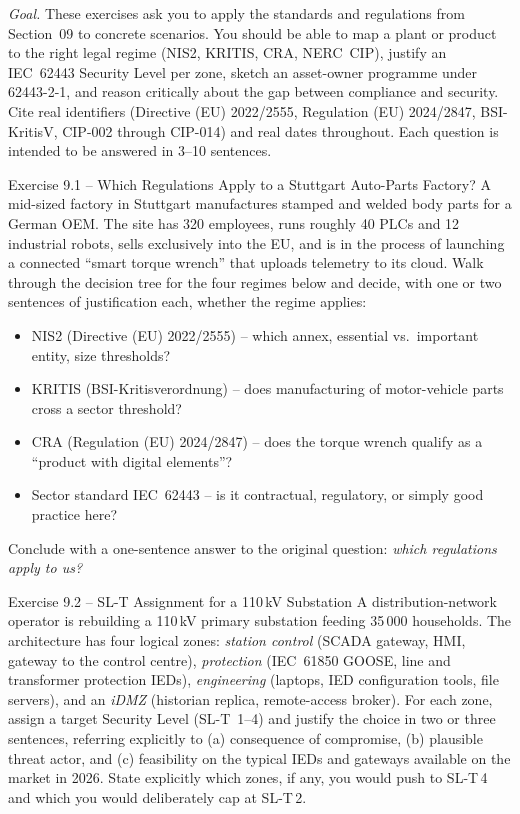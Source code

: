 \documentclass[11pt,a4paper]{article}
\begin{document}
\sheetheader

\noindent\emph{Goal.} These exercises ask you to apply the standards and regulations from Section~09 to concrete scenarios. You should be able to map a plant or product to the right legal regime (NIS2, KRITIS, CRA, NERC~CIP), justify an IEC~62443 Security Level per zone, sketch an asset-owner programme under 62443-2-1, and reason critically about the gap between compliance and security. Cite real identifiers (Directive (EU) 2022/2555, Regulation (EU) 2024/2847, BSI-KritisV, CIP-002 through CIP-014) and real dates throughout. Each question is intended to be answered in 3--10 sentences.

\begin{taskbox}{Exercise 9.1 -- Which Regulations Apply to a Stuttgart Auto-Parts Factory?}
A mid-sized factory in Stuttgart manufactures stamped and welded body parts for a German OEM. The site has 320 employees, runs roughly 40 PLCs and 12 industrial robots, sells exclusively into the EU, and is in the process of launching a connected ``smart torque wrench'' that uploads telemetry to its cloud. Walk through the decision tree for the four regimes below and decide, with one or two sentences of justification each, whether the regime applies:
\begin{itemize}
  \item NIS2 (Directive (EU) 2022/2555) -- which annex, essential vs.\ important entity, size thresholds?
  \item KRITIS (BSI-Kritisverordnung) -- does manufacturing of motor-vehicle parts cross a sector threshold?
  \item CRA (Regulation (EU) 2024/2847) -- does the torque wrench qualify as a ``product with digital elements''?
  \item Sector standard IEC~62443 -- is it contractual, regulatory, or simply good practice here?
\end{itemize}
Conclude with a one-sentence answer to the original question: \emph{which regulations apply to us?}
\end{taskbox}

\begin{taskbox}{Exercise 9.2 -- SL-T Assignment for a 110\,kV Substation}
A distribution-network operator is rebuilding a 110\,kV primary substation feeding 35\,000 households. The architecture has four logical zones: \emph{station control} (SCADA gateway, HMI, gateway to the control centre), \emph{protection} (IEC~61850 GOOSE, line and transformer protection IEDs), \emph{engineering} (laptops, IED configuration tools, file servers), and an \emph{iDMZ} (historian replica, remote-access broker). For each zone, assign a target Security Level (SL-T~1--4) and justify the choice in two or three sentences, referring explicitly to (a) consequence of compromise, (b) plausible threat actor, and (c) feasibility on the typical IEDs and gateways available on the market in 2026. State explicitly which zones, if any, you would push to SL-T\,4 and which you would deliberately cap at SL-T\,2.
\end{taskbox}
\end{document}
